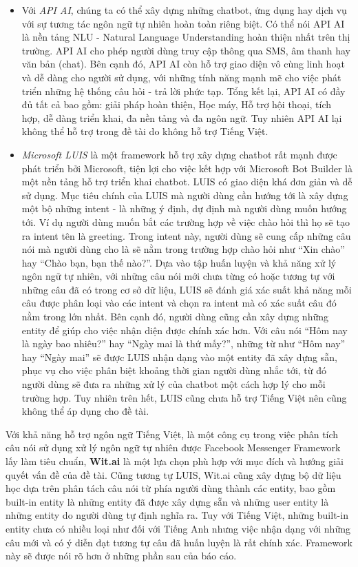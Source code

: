 \documentclass[12pt]{report}
\begin{document}
\begin{itemize}
	\item Với \textit{API AI}, chúng ta có thể xây dựng những chatbot, ứng dụng hay dịch vụ với sự tương tác ngôn ngữ tự nhiên hoàn toàn riêng biệt. Có thể nói API AI là nền tảng NLU - Natural Language Understanding hoàn thiện nhất trên thị trường. API AI cho phép người dùng truy cập thông qua SMS, âm thanh hay văn bản (chat). Bên cạnh đó, API AI còn hỗ trợ giao diện vô cùng linh hoạt và dễ dàng cho người sử dụng, với những tính năng mạnh mẽ cho việc phát triển những hệ thống câu hỏi - trả lời phức tạp. Tổng kết lại, API AI có đầy đủ tất cả bao gồm: giải pháp hoàn thiện, Học máy, Hỗ trợ hội thoại, tích hợp, dễ dàng triển khai, đa nền tảng và đa ngôn ngữ. Tuy nhiên API AI lại không thể hỗ trợ trong đề tài do không hỗ trợ Tiếng Việt\cite{apiai}.
	\item \textit{Microsoft LUIS} là một framework hỗ trợ xây dựng chatbot rất mạnh được phát triển bởi Microsoft, tiện lợi cho việc kết hợp với Microsoft Bot Builder là một nền tảng hỗ trợ triển khai chatbot. LUIS có giao diện khá đơn giản và dễ sử dụng. Mục tiêu chính của LUIS mà người dùng cần hướng tới là xây dựng một bộ những intent - là những ý định, dự định mà người dùng muốn hướng tới. Ví dụ người dùng muốn bắt các trường hợp về việc chào hỏi thì họ sẽ tạo ra intent tên là greeting. Trong intent này, người dùng sẽ cung cấp những câu nói mà người dùng cho là sẽ nằm trong trường hợp chào hỏi như ``Xin chào'' hay ``Chào bạn, bạn thế nào?''. Dựa vào tập huấn luyện và khả năng xử lý ngôn ngữ tự nhiên, với những câu nói mới chưa từng có hoặc tương tự với những câu đã có trong cơ sở dữ liệu, LUIS sẽ đánh giá xác suất khả năng mỗi câu được phân loại vào các intent và chọn ra intent mà có xác suất câu đó nằm trong lớn nhất. Bên cạnh đó, người dùng cũng cần xây dựng những entity để giúp cho việc nhận diện được chính xác hơn. Với câu nói ``Hôm nay là ngày bao nhiêu?'' hay ``Ngày mai là thứ mấy?'', những từ như ``Hôm nay'' hay ``Ngày mai'' sẽ được LUIS nhận dạng vào một entity đã xây dựng sẵn, phục vụ cho việc phân biệt khoảng thời gian người dùng nhắc tới, từ đó người dùng sẽ đưa ra những xử lý của chatbot một cách hợp lý cho mỗi trường hợp. Tuy nhiên trên hết, LUIS cũng chưa hỗ trợ Tiếng Việt nên cũng không thể áp dụng cho đề tài\cite{luis}.
\end{itemize}

Với khả năng hỗ trợ ngôn ngữ Tiếng Việt, là một công cụ trong việc phân tích câu nói sử dụng xử lý ngôn ngữ tự nhiên được Facebook Messenger Framework lấy làm tiêu chuẩn, \textbf{Wit.ai} là một lựa chọn phù hợp với mục đích và hướng giải quyết vấn đề của đề tài. Cũng tương tự LUIS, Wit.ai cũng xây dựng bộ dữ liệu học dựa trên phân tách câu nói từ phía người dùng thành các entity, bao gồm built-in entity là những entity đã được xây dựng sẵn và những user entity là những entity do người dùng tự định nghĩa ra. Tuy với Tiếng Việt, những built-in entity chưa có nhiều loại như đối với Tiếng Anh nhưng việc nhận dạng với những câu mới và có ý diễn đạt tương tự câu đã huấn luyện là rất chính xác. Framework này sẽ được nói rõ hơn ở những phần sau của báo cáo.
\end{document}
